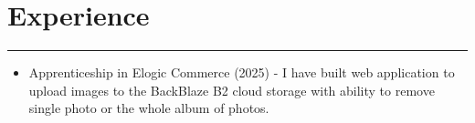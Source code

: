 {
    \section*{Experience}
    \par\noindent\rule{\textwidth}{0.1mm}
    \begin{itemize}
        \item Apprenticeship in Elogic Commerce (2025) - 
        I have built web application to upload images to the BackBlaze B2 cloud storage with ability to remove single photo or the whole album of photos.
    \end{itemize}
}
